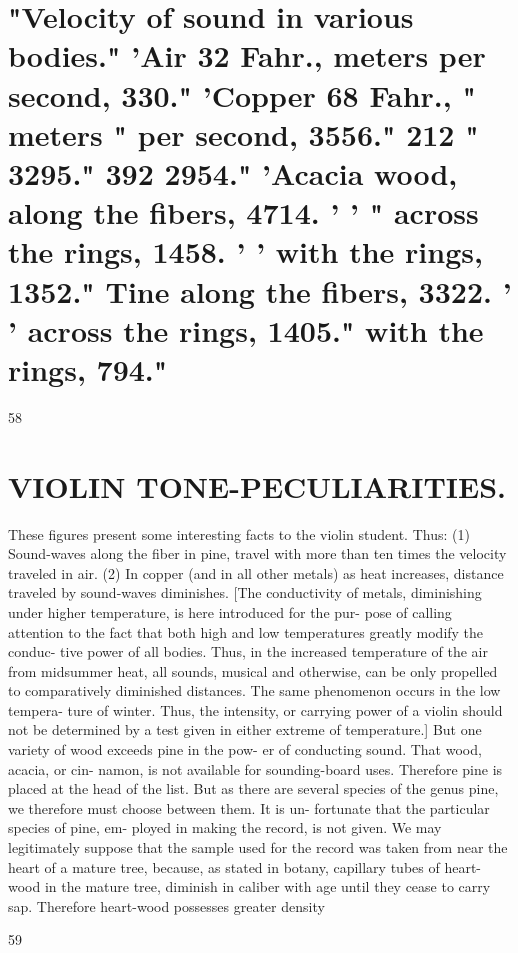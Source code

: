 \documentclass{article}
\begin{document}
\section*{"Velocity of sound in various bodies." 'Air 32 Fahr., meters per second, 330." 'Copper 68 Fahr., " meters " per second, 3556." 212 " 3295." 392 2954." 'Acacia wood, along the fibers, 4714. ' ' " across the rings, 1458. ' ' with the rings, 1352." Tine along the fibers, 3322. ' ' across the rings, 1405." with the rings, 794."}
58

\section*{VIOLIN TONE-PECULIARITIES.}
These figures present some interesting facts to the violin student. Thus: (1) Sound-waves along the fiber in pine, travel with more than ten times the velocity traveled in air. (2) In copper (and in all other metals) as heat increases, distance traveled by sound-waves diminishes. [The conductivity of metals, diminishing under higher temperature, is here introduced for the pur- pose of calling attention to the fact that both high and low temperatures greatly modify the conduc- tive power of all bodies. Thus, in the increased temperature of the air from midsummer heat, all sounds, musical and otherwise, can be only propelled to comparatively diminished distances. The same phenomenon occurs in the low tempera- ture of winter. Thus, the intensity, or carrying power of a violin should not be determined by a test given in either extreme of temperature.] But one variety of wood exceeds pine in the pow- er of conducting sound. That wood, acacia, or cin- namon, is not available for sounding-board uses. Therefore pine is placed at the head of the list. But as there are several species of the genus pine, we therefore must choose between them. It is un- fortunate that the particular species of pine, em- ployed in making the record, is not given. We may legitimately suppose that the sample used for the record was taken from near the heart of a mature tree, because, as stated in botany, capillary tubes of heart-wood in the mature tree, diminish in caliber with age until they cease to carry sap. Therefore heart-wood possesses greater density

59
\end{document}
